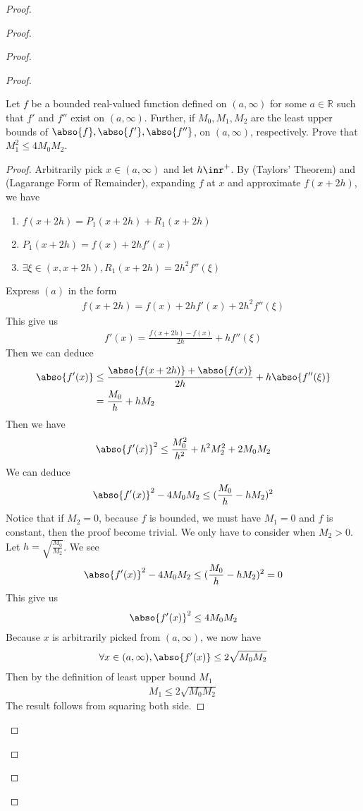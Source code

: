 \documentclass{report}
\begin{document}
\begin{proof}
\begin{proof}
\begin{proof}
\begin{proof}
\begin{question}{}{}
Let \( f \) be a bounded real-valued function defined on \( (a, \infty) \) for some \( a \in \mathbb{R} \) such that \( f' \) and \( f'' \) exist on \( (a, \infty) \). Further, if \( M_0, M_1, M_2 \) are the least upper bounds of \( \abso{f}, \abso{f'}, \abso{f''} \), on \( (a, \infty) \), respectively. Prove that \( M_1^2 \leq 4M_0M_2 \).
\end{question}
\begin{proof}
Arbitrarily pick $x\in (a,\infty)$ and let $h\inr^+$. By  (Taylors' Theorem) and  (Lagarange Form of Remainder), expanding $f$ at $x$ and approximate $f(x+2h)$, we have 
\begin{enumerate}[label=(\alph*)]
  \item $f(x+2h)=P_1(x+2h)+R_1(x+2h)$ 
  \item $P_1(x+2h)=f(x)+2hf'(x)$ 
  \item $\exists \xi \in (x,x+2h), R_1(x+2h)=2h^2f''(\xi)$
\end{enumerate}
Express $(a)$ in the form 
\begin{align*}
f(x+2h)=f(x)+2hf'(x)+2h^2f''(\xi)
\end{align*}
This give us 
\begin{align*}
f'(x)=\frac{f(x+2h)-f(x)}{2h}+hf''(\xi)
\end{align*}
Then we can deduce 
\begin{align*}
\abso{f'(x)}&\leq \frac{\abso{f(x+2h)}+\abso{f(x)}}{2h}+ h \abso{f''(\xi)}\\
&=\frac{M_0}{h}+hM_2
\end{align*}
Then we have 
\begin{align*}
\abso{f'(x)}^2\leq \frac{M_0^2}{h^2}+h^2M_2^2+2M_0M_2
\end{align*}
We can deduce 
\begin{align*}
\abso{f'(x)}^2-4M_0M_2\leq (\frac{M_0}{h}-hM_2)^2
\end{align*}
Notice that if $M_2=0$, because $f$ is bounded, we must have  $M_1=0$ and  $f$ is constant, then the proof become trivial. We only have to consider when $M_2>0$. Let $h=\sqrt{\frac{M_0}{M_2}} $. We see 
\begin{align*}
\abso{f'(x)}^2-4M_0M_2\leq (\frac{M_0}{h}-hM_2)^2=0
\end{align*}
This give us 
\begin{align*}
\abso{f'(x)}^2\leq 4M_0M_2
\end{align*}
Because $x$ is arbitrarily picked from  $(a,\infty)$, we now have 
\begin{align*}
\forall x\in (a,\infty), \abso{f'(x)}\leq 2\sqrt{M_0M_2} 
\end{align*}
Then by the definition of least upper bound $M_1$
 \begin{align*}
M_1\leq 2\sqrt{M_0M_2} 
\end{align*}
The result follows from squaring both side.


\end{proof}
\end{proof}
\end{proof}
\end{proof}
\end{proof}
\end{document}
